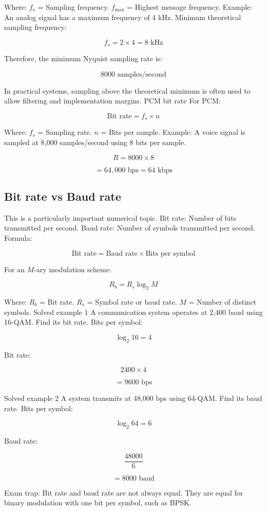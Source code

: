 Where:
$f_s$ = Sampling frequency.
$f_{\max}$ = Highest message frequency.
Example:
An analog signal has a maximum frequency of 4 kHz.
Minimum theoretical sampling frequency:

\[
f_s=2\times4=8\text{ kHz}
\]

Therefore, the minimum Nyquist sampling rate is:

\[
\boxed{8000\text{ samples/second}}
\]

In practical systems, sampling above the theoretical minimum is often used to allow filtering and implementation margins.
PCM bit rate
For PCM:

\[
\boxed{\text{Bit rate}=f_s\times n}
\]

Where:
$f_s$ = Sampling rate.
$n$ = Bits per sample.
Example:
A voice signal is sampled at 8,000 samples/second using 8 bits per sample.

\[
R=8000\times8
\]


\[
=\boxed{64,000\text{ bps}=64\text{ kbps}}
\]

\subsection{Bit rate vs Baud rate}
This is a particularly important numerical topic.
Bit rate: Number of bits transmitted per second.
Baud rate: Number of symbols transmitted per second.
Formula:

\[
\boxed{\text{Bit rate}=\text{Baud rate}\times\text{Bits per symbol}}
\]

For an $M$-ary modulation scheme:

\[
\boxed{R_b=R_s\log_2 M}
\]

Where:
$R_b$ = Bit rate.
$R_s$ = Symbol rate or baud rate.
$M$ = Number of distinct symbols.
Solved example 1
A communication system operates at 2,400 baud using 16-QAM.
Find its bit rate.
Bits per symbol:

\[
\log_2 16=4
\]

Bit rate:

\[
2400\times4
\]


\[
=\boxed{9600\text{ bps}}
\]

Solved example 2
A system transmits at 48,000 bps using 64-QAM.
Find its baud rate.
Bits per symbol:

\[
\log_2 64=6
\]

Baud rate:

\[
\frac{48000}{6}
\]


\[
=\boxed{8000\text{ baud}}
\]

Exam trap: Bit rate and baud rate are not always equal. They are equal for binary modulation with one bit per symbol, such as BPSK.


